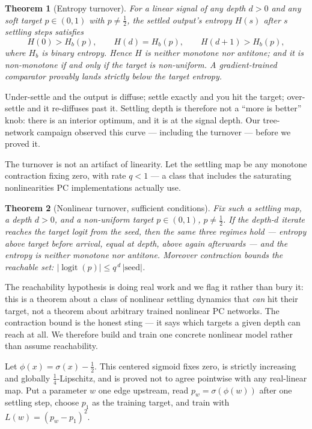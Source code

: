 \documentclass[11pt]{article}
\newtheorem{theorem}{Theorem}[section]
\begin{document}
\begin{theorem}[Entropy turnover]\label{thm:turnover}
For a linear signal of any depth $d > 0$ and any soft target $p \in (0,1)$ with
$p \neq \tfrac12$, the settled output's entropy $H(s)$ after $s$ settling steps satisfies
\[
H(0) > H_b(p), \qquad H(d) = H_b(p), \qquad H(d+1) > H_b(p),
\]
where $H_b$ is binary entropy. Hence $H$ is neither monotone nor antitone; and it is
non-monotone \emph{if and only if} the target is non-uniform. A gradient-trained
comparator provably lands strictly below the target entropy.
\end{theorem}

Under-settle and the output is diffuse; settle exactly and you hit the target; over-settle
and it re-diffuses past it. Settling depth is therefore not a ``more is better'' knob:
there is an interior optimum, and it is at the signal depth. Our tree-network campaign
observed this curve --- including the turnover --- before we proved it.

The turnover is not an artifact of linearity. Let the settling map be any monotone
contraction fixing zero, with rate $q < 1$ --- a class that includes the saturating
nonlinearities PC implementations actually use.

\begin{theorem}[Nonlinear turnover, sufficient conditions]\label{thm:nonlin}
Fix such a settling map, a depth $d>0$, and a non-uniform target $p \in (0,1)$,
$p \neq \tfrac12$. If the depth-$d$ iterate reaches the target logit from the seed, then
the same three regimes hold --- entropy above target before arrival, equal at depth,
above again afterwards --- and the entropy is neither monotone nor antitone. Moreover
contraction bounds the reachable set: $|\operatorname{logit}(p)| \le q^{\,d}\,|\text{seed}|$.
\end{theorem}

The reachability hypothesis is doing real work and we flag it rather than bury it: this is
a theorem about a class of nonlinear settling dynamics that \emph{can} hit their target,
not a theorem about arbitrary trained nonlinear PC networks. The contraction bound is the
honest sting --- it says which targets a given depth can reach at all. We therefore build
and train one concrete nonlinear model rather than assume reachability.

Let $\phi(x)=\sigma(x)-\tfrac12$. This centered sigmoid fixes zero, is strictly
increasing and globally $\tfrac14$-Lipschitz, and is proved not to agree pointwise with
any real-linear map. Put a parameter $w$ one edge upstream, read
$p_w=\sigma(\phi(w))$ after one settling step, choose $p_1$ as the training target, and
train with $L(w)=(p_w-p_1)^2$.
\end{document}
